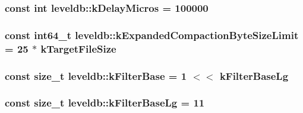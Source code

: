 \hypertarget{namespaceleveldb_a5534e21c4b10affbe7390a9642ac0668}{
\subsubsection[{k\-Delay\-Micros}]{\setlength{\rightskip}{0pt plus 5cm}const int leveldb\-::k\-Delay\-Micros = 100000\hspace{0.3cm}{\ttfamily [static]}}}\label{namespaceleveldb_a5534e21c4b10affbe7390a9642ac0668}
\hypertarget{namespaceleveldb_a226c83695ff13a8d8bc5a248bdd4bd29}{
\subsubsection[{k\-Expanded\-Compaction\-Byte\-Size\-Limit}]{\setlength{\rightskip}{0pt plus 5cm}const {\bf int64\-\_\-t} leveldb\-::k\-Expanded\-Compaction\-Byte\-Size\-Limit = 25 $\ast$ {\bf k\-Target\-File\-Size}\hspace{0.3cm}{\ttfamily [static]}}}\label{namespaceleveldb_a226c83695ff13a8d8bc5a248bdd4bd29}
\hypertarget{namespaceleveldb_a98b7e84ea18ed9d60211fd297359cc78}{
\subsubsection[{k\-Filter\-Base}]{\setlength{\rightskip}{0pt plus 5cm}const size\-\_\-t leveldb\-::k\-Filter\-Base = 1 $<$$<$ {\bf k\-Filter\-Base\-Lg}\hspace{0.3cm}{\ttfamily [static]}}}\label{namespaceleveldb_a98b7e84ea18ed9d60211fd297359cc78}
\hypertarget{namespaceleveldb_a84056738cd05489322f3480723d55d6d}{
\subsubsection[{k\-Filter\-Base\-Lg}]{\setlength{\rightskip}{0pt plus 5cm}const size\-\_\-t leveldb\-::k\-Filter\-Base\-Lg = 11\hspace{0.3cm}{\ttfamily [static]}}}\label{namespaceleveldb_a84056738cd05489322f3480723d55d6d}
